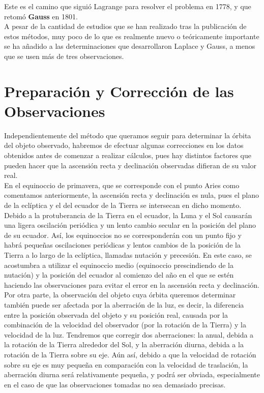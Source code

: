 \documentclass[11pt]{book}
\begin{document}
Este es el camino que siguió Lagrange para resolver el problema en 1778, y que retomó \textbf{Gauss} en 1801.\\

A pesar de la cantidad de estudios que se han realizado tras la publicación de estos métodos, muy poco de lo que es realmente nuevo o teóricamente importante se ha añadido a las determinaciones que desarrollaron Laplace y Gauss, a menos que se usen más de tres observaciones.\\


\section{Preparación y Corrección de las Observaciones}
Independientemente del método que queramos seguir para determinar la órbita del objeto observado, habremos de efectuar algunas correcciones en los datos obtenidos antes de comenzar a realizar cálculos, pues hay distintos factores que pueden hacer que la ascensión recta y declinación observadas difieran de su valor real.\\

En el equinoccio de primavera, que se corresponde con el punto Aries como comentamos anteriormente, la ascensión recta y declinación es nula, pues el plano de la eclíptica y el del ecuador de la Tierra se intersecan en dicho momento. Debido a la protuberancia de la Tierra en el ecuador, la Luna y el Sol causarán una ligera oscilación periódica y un lento cambio secular en la posición del plano de su ecuador. Así, los equinoccios no se corresponderán con un punto fijo y habrá pequeñas oscilaciones periódicas y lentos cambios de la posición de la Tierra a lo largo de la eclíptica, llamadas nutación y precesión. En este caso, se acostumbra a utilizar el equinoccio medio (equinoccio prescindiendo de la nutación) y la posición del ecuador al comienzo del año en el que se estén haciendo las observaciones para evitar el error en la ascensión recta y declinación.\\

Por otra parte, la observación del objeto cuya órbita queremos determinar también puede ser afectada por la aberración de la luz, es decir, la diferencia entre la posición observada del objeto y su posición real, causada por la combinación de la velocidad del observador (por la rotación de la Tierra) y la velocidad de la luz. Tendremos que corregir dos aberraciones: la anual, debida a la rotación de la Tierra alrededor del Sol, y la aberración diurna, debida a la rotación de la Tierra sobre su eje. Aún así, debido a que la velocidad de rotación sobre su eje es muy pequeña en comparación con la velocidad de traslación, la aberración diurna será relativamente pequeña, y podrá ser obviada, especialmente en el caso de que las observaciones tomadas no sea demasiado precisas.\\
\end{document}
